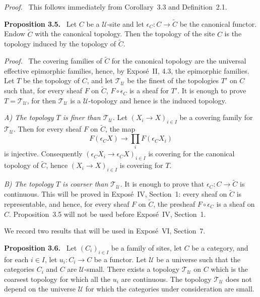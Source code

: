 \documentclass[11pt]{article}
\newcommand{\U}{\mathcal{U}}
\newcommand{\T}{\mathcal{T}}
\newenvironment{statement}[1]{\par\medskip\noindent\textbf{#1.}\ }{\par\medskip}
\newenvironment{prooftext}{\par\noindent\emph{Proof.}\ }{\par\medskip}
\begin{document}
\begin{prooftext}
This follows immediately from Corollary~3.3 and Definition~2.1.
\end{prooftext}

\begin{statement}{Proposition 3.5}
Let \(C\) be a \(\U\)-site and let \(\epsilon_C:C\to\widetilde C\) be the canonical functor. Endow \(\widetilde C\) with the canonical topology. Then the topology of the site \(C\) is the topology induced by the topology of \(\widetilde C\).
\end{statement}

\begin{prooftext}
The covering families of \(\widetilde C\) for the canonical topology are the universal effective epimorphic families, hence, by Expos\'e~II, 4.3, the epimorphic families. Let \(T\) be the topology of \(C\), and let \(\T_{\U}\) be the finest of the topologies \(T'\) on \(C\) such that, for every sheaf \(F\) on \(\widetilde C\), \(F\circ\epsilon_C\) is a sheaf for \(T'\). It is enough to prove \(T=\T_{\U}\), for then \(\T_{\U}\) is a \(\U\)-topology and hence is the induced topology.

\emph{A) The topology \(T\) is finer than \(\T_{\U}\).} Let \((X_i\to X)_{i\in I}\) be a covering family for \(\T_{\U}\). Then for every sheaf \(F\) on \(\widetilde C\), the map
\[
F(\epsilon_CX)\to\prod_iF(\epsilon_CX_i)
\]
is injective. Consequently \((\epsilon_CX_i\to\epsilon_CX)_{i\in I}\) is covering for the canonical topology of \(\widetilde C\), hence \((X_i\to X)_{i\in I}\) is covering for \(T\).

\emph{B) The topology \(T\) is coarser than \(\T_{\U}\).} It is enough to prove that \(\epsilon_C:C\to\widetilde C\) is continuous. This will be proved in Expos\'e~IV, Section~1: every sheaf on \(\widetilde C\) is representable, and hence, for every sheaf \(F\) on \(\widetilde C\), the presheaf \(F\circ\epsilon_C\) is a sheaf on \(C\). Proposition~3.5 will not be used before Expos\'e~IV, Section~1.

We record two results that will be used in Expos\'e~VI, Section~7.
\end{prooftext}

\begin{statement}{Proposition 3.6}
Let \((C_i)_{i\in I}\) be a family of sites, let \(C\) be a category, and for each \(i\in I\), let \(u_i:C_i\to C\) be a functor. Let \(\U\) be a universe such that the categories \(C_i\) and \(C\) are \(\U\)-small. There exists a topology \(\T_{\U}\) on \(C\) which is the coarsest topology for which all the \(u_i\) are continuous. The topology \(\T_{\U}\) does not depend on the universe \(\U\) for which the categories under consideration are small.
\end{statement}
\end{document}
